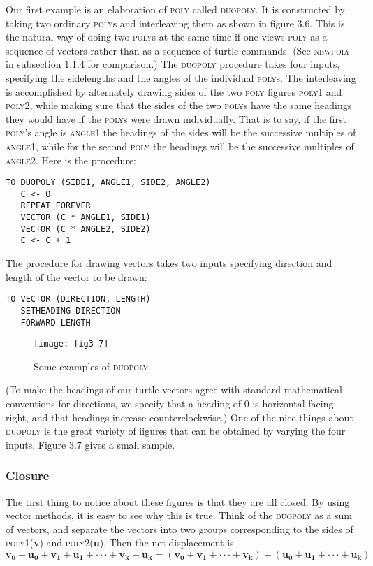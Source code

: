 \documentclass{book}
\begin{document}
Our first example is an elaboration of \textsc{poly} called \textsc{duopoly}. It is
constructed by taking two ordinary \textsc{poly}s and interleaving them as
shown in figure 3.6. This is the natural way of doing two \textsc{poly}s at
the same time if one views \textsc{poly} as a sequence of vectors rather than
as a sequence of turtle commands. (See \textsc{newpoly} in subsection 1.1.4 for
comparison.) The \textsc{duopoly} procedure takes four inputs, specifying the
sidelengths and the angles of the individual \textsc{poly}s. The interleaving is
accomplished by alternately drawing sides of the two \textsc{poly} figures \textsc{poly1}
and \textsc{poly2}, while making sure that the sides of the two \textsc{poly}s have the
same headings they would have if the \textsc{poly}s were drawn individually.
That is to say, if the first \textsc{poly}'s angle is \textsc{angle1} the headings of the
sides will be the successive multiples of \textsc{angle1}, while for the second
\textsc{poly} the headings will be the successive multiples of \textsc{angle2}. Here is
the procedure:

\begin{verbatim}
TO DUOPOLY (SIDE1, ANGLE1, SIDE2, ANGLE2)
   C <- O
   REPEAT FOREVER
   VECTOR (C * ANGLE1, SIDE1)
   VECTOR (C * ANGLE2, SIDE2)
   C <- C + 1
\end{verbatim}
The procedure for drawing vectors takes two inputs specifying direction
and length of the vector to be drawn:

\begin{verbatim}
TO VECTOR (DIRECTION, LENGTH)
   SETHEADING DIRECTION
   FORWARD LENGTH
\end{verbatim}
\begin{figure}
\begin{center}
\texttt{[image: fig3-7]}
\caption{Some examples of \textsc{duopoly}}
\end{center}
\end{figure}


(To make the headings of our turtle vectors agree with standard mathematical conventions for directions, we specify that a heading of 0 is
horizontal facing right, and that headings increase counterclockwise.)
One of the nice things about \textsc{duopoly} is the great variety of iigures
that can be obtained by varying the four inputs. Figure 3.7 gives a small
sample.

\subsubsection{Closure}
The tirst thing to notice about these figures is that they are all closed.
By using vector methods, it is easy to see why this is true. Think of the
\textsc{duopoly} as a sum of vectors, and separate the vectors into two groups
corresponding to the sides of \textsc{poly1}(\textbf{v}) and \textsc{poly2}(\textbf{u}). Then the net
displacement is
$$\mathbf{v_0}+\mathbf{u_0}+\mathbf{v_1}+\mathbf{u_1}+\cdot \cdot \cdot+\mathbf{v_k}+\mathbf{u_k}=(\mathbf{v_0}+\mathbf{v_1}+\cdot \cdot \cdot + \mathbf{v_k})+(\mathbf{u_0}+\mathbf{u_1}+\cdot \cdot \cdot+\mathbf{u_k})$$
\end{document}
